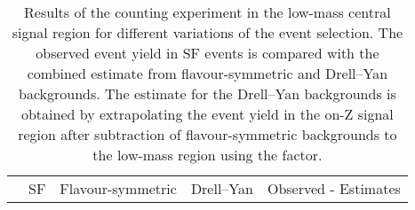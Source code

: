 
\begin{table}[hbtp]
 \renewcommand{\arraystretch}{1.3}
 \setlength{\belowcaptionskip}{6pt}
 \centering
 \caption{Results of the counting experiment in the low-mass central signal region for different variations of the event selection. The observed event yield in SF events is compared with the combined estimate from flavour-symmetric and Drell--Yan backgrounds. The estimate for the Drell--Yan backgrounds is obtained by extrapolating the event yield in the on-Z signal region after subtraction of flavour-symmetric backgrounds to the low-mass region using the \Routin factor.}
  \label{tab:CountingCrosschecks}
  \begin{tabular}{l|c|c|c|c}
                                &  SF        & Flavour-symmetric  &  Drell--Yan  & Observed - Estimates \\ 


\end{tabular}
\end{table}
